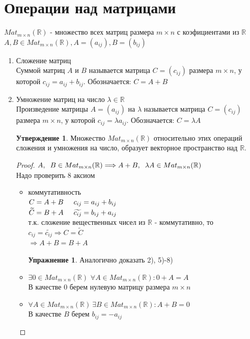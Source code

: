 \documentclass[a4paper, 12pt]{article}
\newcommand{\R}{\mathbb R}
\newcommand\tab[1][.5cm]{\hspace*{#1}}
\theoremstyle{definition}
\newtheorem*{subtheorem}{Утверждение}
\newtheorem*{lalala}{Упражнение}
\begin{document}
  \section{Операции над матрицами}
  $Mat_{m \times n}(\R)$ - множество всех матриц размера $m \times n$ с коэфициентами из $\R$ \\
  $A, B \in Mat_{m \times n}(\R), A=(a_{ij}), B=(b_{ij})$ 
  \begin{enumerate}
    \item Сложение матриц \\
    Суммой матриц $A$ и $B$ называется матрица $C=(c_{ij})$ размера $m \times n$, у которой $c_{ij} = a_{ij} + b_{ij}$. Обозначается: $C = A + B$
    \item Умножение матриц на число $\lambda \in \R$ \\ Произведение матрицы $A=(a_{ij})$ на $\lambda$ называется матрица $C=(c_{ij})$ размера $m \times n$, у которой $c_{ij} = \lambda a_{ij}$. Обозначается: $C = \lambda A$
    \begin{subtheorem}
      Множество $Mat_{m \times n}(\R)$ относительно этих операций сложения и умножения на число, образует векторное пространство над $\R$. 
    \end{subtheorem} 
    \begin{proof}
      $A,\tab [0.2cm]B \in Mat_{m \times n}(\R) \Longrightarrow A+B, \tab [0.2cm]\lambda A \in Mat_{m \times n}(\R)$ \\
      Надо проверить 8 аксиом
      \begin{itemize}
        \item[1)] коммутативность \\
        $C = A + B \tab[0.5cm] c_{ij} = a_{ij} + b_{ij}$ \\
        $\widetilde{C} = B + A \tab[0.5cm] \widetilde{c_{ij}} = b_{ij} + a_{ij}$ \\
        т.к. сложение вещественных чисел из $\R$ - коммутативно, то $c_{ij} = \widetilde{c_{ij}} \Longrightarrow C = \widetilde{C}$ \\
        $\Longrightarrow A + B = B + A$
        \begin{lalala} Аналогично доказать 2), 5)-8)\end{lalala}
        \item[3)] $\exists 0 \in Mat_{m \times n}(\R)$
        $\forall A \in Mat_{m \times n}(\R): 0 + A = A$ \\
        В качестве 0 берем нулевую матрицу размера $m \times n$
        \item[4)] $\forall A \in Mat_{m \times n}(\R) \ \exists B \in Mat_{m \times n}(\R): A+B=0$ \\В качестве $B$ берем $b_{ij} = -a_{ij}$ 

\end{itemize}
\end{proof}
\end{enumerate}
\end{document}
